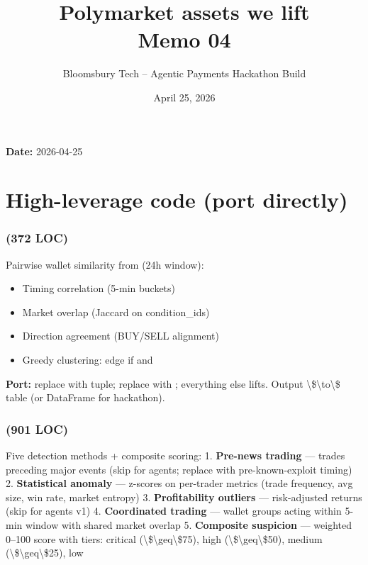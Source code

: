 \documentclass[11pt]{article}
\title{\textbf{Polymarket assets we lift}\\
\large Memo 04}
\author{Bloomsbury Tech -- Agentic Payments Hackathon Build}
\date{April 25, 2026}
\begin{document}
\maketitle

\textbf{Date:} 2026-04-25

\section{High-leverage code (port directly)}
\subsubsection*{ (372 LOC)}
Pairwise wallet similarity from  (24h window):

\begin{itemize}
  \item Timing correlation (5-min buckets)
  \item Market overlap (Jaccard on condition\_ids)
  \item Direction agreement (BUY/SELL alignment)
  \item Greedy clustering: edge if  and 
\end{itemize}
\textbf{Port:} replace  with  tuple; replace  with ; everything else lifts. Output \textbackslash{}\$\textbackslash{}to\textbackslash{}\$  table (or DataFrame for hackathon).

\subsubsection*{ (901 LOC)}
Five detection methods + composite scoring: 1. \textbf{Pre-news trading} --- trades preceding major events (skip for agents; replace with pre-known-exploit timing) 2. \textbf{Statistical anomaly} --- z-scores on per-trader metrics (trade frequency, avg size, win rate, market entropy) 3. \textbf{Profitability outliers} --- risk-adjusted returns (skip for agents v1) 4. \textbf{Coordinated trading} --- wallet groups acting within 5-min window with shared market overlap 5. \textbf{Composite suspicion} --- weighted 0--100 score with tiers: critical (\textbackslash{}\$\textbackslash{}geq\textbackslash{}\$75), high (\textbackslash{}\$\textbackslash{}geq\textbackslash{}\$50), medium (\textbackslash{}\$\textbackslash{}geq\textbackslash{}\$25), low
\end{document}
